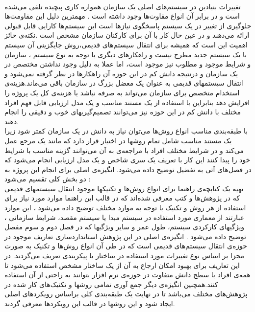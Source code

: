 \\
تغییرات بنیادین در سیستم‌های اصلی یک سازمان همواره کاری پیچیده تلقی می‌شده است و در برابر آن انواع مقاوت‌ها وجود داشته است . مهمترین دلیل این مقاومت‌ها جلوگیری از تغییر در یک سیستم پاسخگوی نیازها است این سیستم‌ها کارایی قابل قبولی ارائه می‌دهند و در عین حال کار با آن برای کارکنان سازمان مشخص است .نکته‌ی حائز اهمیت این است که همیشه برای انتقال سیستم‌های قدیمی،روش جایگزینی آن سیستم با یک سیستم جدید مطرح نیست و راهکارهای دیگری با توجه به نوع سیستم ، سازمان و شرایط موجود و مطلوب نیز موجود است، اما عملا به دلیل وجود نداشتن مختصص در یک سازمان و درنتیجه دانش کم در این حوزه  آن راهکارها در نظر  گرفته 
نمی‌شود و انتقال سیستمهای قدیمی به عنوان یک معضل بزرگ در سازمان باقی می‌ماند.هزینه‌ی استخدام متخصص برای سازمان می‌تواند به صرفه نباشد یا هزینه‌ی کل یک پروژه را افزایش دهد بنابراین با استفاده از یک مستند مناسب و یک مدل ارزیابی قابل فهم افراد مختلف با دانش کم در این حوزه نیز می‌توانند تصمیم‌گیریهای خوب و دقیقی را انجام دهند.
\\
 با طبقه‌بندی مناسب انواع روش‌ها  می‌توان نیاز به دانش در یک سازمان کمتر شود زیرا یک مستند مناسب شامل تمام روشها در اختیار قرار دارد که مانند یک مرجع عمل می‌کند و در شرایط مختلف افراد با مراجعه‌ی به آن می‌توانند گزینه مناسب با  شرایط خود را پیدا کنند این کار با تعریف یک سری شاخص و  یک مدل ارزیابی انجام می‌شود که در فصل‌های آتی به تفضیل توضیح داده می‌شود.
انگیزه‌ی اصلی برای  انجام این  پروژه به دو بخش کلی تقسیم می‌شود :
\\
تهیه یک کتابچه‌ی راهنما برای انواع روش‌ها و تکنیکها موجود انتقال سیستمهای قدیمی که در پژوهش‌ها و کتب معرفی شده‌اند که در قالب  این راهنما موارد مورد نیاز برای استفاده از هر روش و تکنیک با توجه به موارد مختلف توضیح داده می‌شود ، این موارد عبارتند از  معماری مورد استفاده در سیستم مبدا یا سیستم مقصد، شرایط سازمانی ، ویژگیهای کارکردی سیستم، طول عمر و سایر ویژگیها که در فصل دوم و سوم مفصل توضیح داده می‌شود . انگیزه‌ی اصلی در این پژوهش استانداردسازی تعاریف موجود در حوزه‌ی انتقال سیستم‌های قدیمی  است که در طی آن انواع روش‌ها و تکنیک به صورت مجزا بر اساس نوع تغییرات مورد استفاده در ساختار یا پیکربندی تعریف می‌گردند. در این تعاریف برای بهبود امکان ارجاع به آن از یک ساختار مشخص استفاده می‌شود تا همه‌ی افراد با سطح دانش متفاوت در حوزه‌ی نرم افزار بتوانند به راحتی از آن استفاده کنند.همچنین انگیزه‌ی دیگر جمع آوری تمامی روشها و تکنیک‌های کار شده در پژوهش‌های مختلف می‌باشد تا  در نهایت یک طبقه‌بندی کلی براساس رویکردهای اصلی ایجاد شود و این روشها در قالب این رویکردها معرفی گردند.
\\
